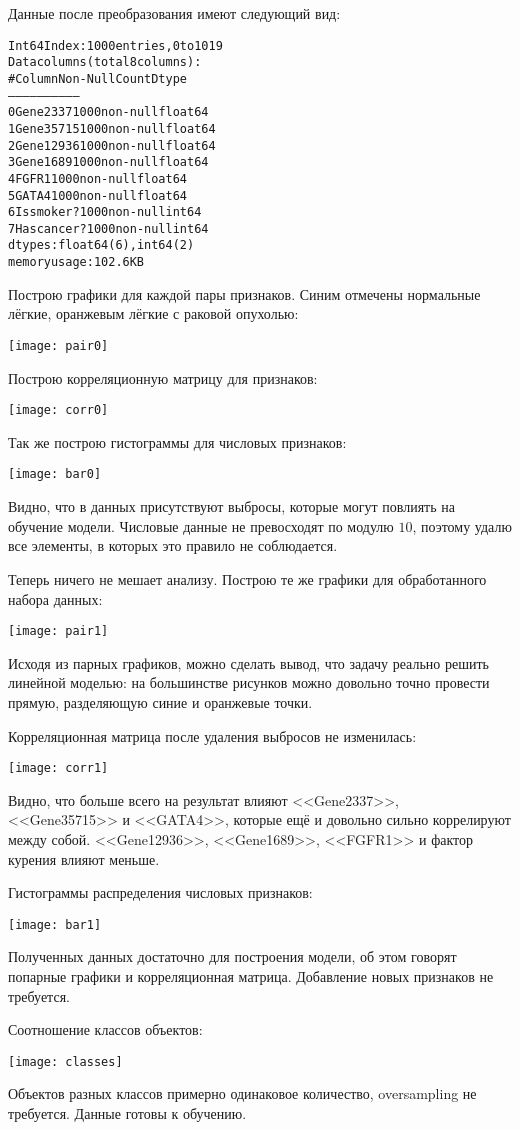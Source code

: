 Данные после преобразования имеют следующий вид:
\begin{alltt}
Int64Index: 1000 entries, 0 to 1019
Data columns (total 8 columns):
 #   Column       Non-Null Count  Dtype
---  ------       --------------  -----
 0   Gene2337     1000 non-null   float64
 1   Gene35715    1000 non-null   float64
 2   Gene12936    1000 non-null   float64
 3   Gene1689     1000 non-null   float64
 4   FGFR1        1000 non-null   float64
 5   GATA4        1000 non-null   float64
 6   Is smoker?   1000 non-null   int64
 7   Has cancer?  1000 non-null   int64
dtypes: float64(6), int64(2)
memory usage: 102.6 KB
\end{alltt}
\pagebreak

Построю графики для каждой пары признаков. Синим отмечены нормальные лёгкие, оранжевым лёгкие с раковой опухолью:
\begin{center}
\texttt{[image: pair0]}
\end{center}\pagebreak

Построю корреляционную матрицу для признаков:
\begin{center}
\texttt{[image: corr0]}
\end{center}
Так же построю гистограммы для числовых признаков:
\begin{center}
\texttt{[image: bar0]}
\end{center}
Видно, что в данных присутствуют выбросы, которые могут повлиять на обучение модели. Числовые данные не превосходят по модулю $10$, поэтому удалю все элементы, в которых это правило не соблюдается.
\pagebreak

Теперь ничего не мешает анализу. Построю те же графики для обработанного набора данных:
\begin{center}
\texttt{[image: pair1]}
\end{center}
Исходя из парных графиков, можно сделать вывод, что задачу реально решить линейной моделью: на большинстве рисунков можно довольно точно провести прямую, разделяющую синие и оранжевые точки.
\pagebreak

Корреляционная матрица после удаления выбросов не изменилась:
\begin{center}
\texttt{[image: corr1]}
\end{center}
Видно, что больше всего на результат влияют <<Gene2337>>, <<Gene35715>> и <<GATA4>>, которые ещё и довольно сильно коррелируют между собой. <<Gene12936>>, <<Gene1689>>, <<FGFR1>> и фактор курения влияют меньше.

Гистограммы распределения числовых признаков:
\begin{center}
\texttt{[image: bar1]}
\end{center}
Полученных данных достаточно для построения модели, об этом говорят попарные графики и корреляционная матрица. Добавление новых признаков не требуется.

\pagebreak

Соотношение классов объектов:
\begin{center}
\texttt{[image: classes]}
\end{center}
Объектов разных классов примерно одинаковое количество, oversampling не требуется. Данные готовы к обучению.

\pagebreak
